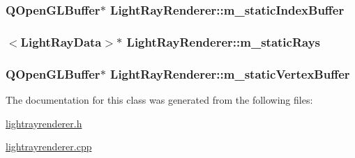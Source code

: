\hypertarget{class_light_ray_renderer_ab78cd6dadbb241b4d8929f5f1b60995a}{
\subsubsection[{m\+\_\+static\+Index\+Buffer}]{\setlength{\rightskip}{0pt plus 5cm}Q\+Open\+G\+L\+Buffer$\ast$ Light\+Ray\+Renderer\+::m\+\_\+static\+Index\+Buffer\hspace{0.3cm}{\ttfamily [protected]}}}\label{class_light_ray_renderer_ab78cd6dadbb241b4d8929f5f1b60995a}
\hypertarget{class_light_ray_renderer_a6524c19725083f59fe41616998dcf111}{
\subsubsection[{m\+\_\+static\+Rays}]{$<${\bf Light\+Ray\+Data}$>$$\ast$ Light\+Ray\+Renderer\+::m\+\_\+static\+Rays\hspace{0.3cm}{\ttfamily [protected]}}}\label{class_light_ray_renderer_a6524c19725083f59fe41616998dcf111}
\hypertarget{class_light_ray_renderer_af21bb4b6a08c84b13753860a0a89b199}{
\subsubsection[{m\+\_\+static\+Vertex\+Buffer}]{\setlength{\rightskip}{0pt plus 5cm}Q\+Open\+G\+L\+Buffer$\ast$ Light\+Ray\+Renderer\+::m\+\_\+static\+Vertex\+Buffer\hspace{0.3cm}{\ttfamily [protected]}}}\label{class_light_ray_renderer_af21bb4b6a08c84b13753860a0a89b199}


The documentation for this class was generated from the following files\+:\begin{DoxyCompactItemize}
\item 
\hyperlink{lightrayrenderer_8h}{lightrayrenderer.\+h}\item 
\hyperlink{lightrayrenderer_8cpp}{lightrayrenderer.\+cpp}\end{DoxyCompactItemize}

